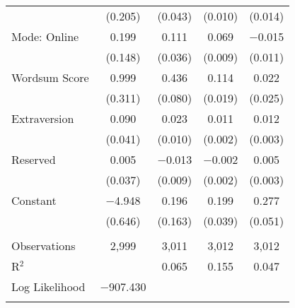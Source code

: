 \begin{table}[!htbp]
\begin{tabular}{@{\extracolsep{0pt}}lcccc}
  & (0.205) & (0.043) & (0.010) & (0.014) \\ 
  Mode: Online & 0.199 & 0.111 & 0.069 & $-$0.015 \\ 
  & (0.148) & (0.036) & (0.009) & (0.011) \\ 
  Wordsum Score & 0.999 & 0.436 & 0.114 & 0.022 \\ 
  & (0.311) & (0.080) & (0.019) & (0.025) \\ 
  Extraversion & 0.090 & 0.023 & 0.011 & 0.012 \\ 
  & (0.041) & (0.010) & (0.002) & (0.003) \\ 
  Reserved & 0.005 & $-$0.013 & $-$0.002 & 0.005 \\ 
  & (0.037) & (0.009) & (0.002) & (0.003) \\ 
  Constant & $-$4.948 & 0.196 & 0.199 & 0.277 \\ 
  & (0.646) & (0.163) & (0.039) & (0.051) \\ 
 \hline \\[-1.8ex] 
Observations & 2,999 & 3,011 & 3,012 & 3,012 \\ 
R$^{2}$ &  & 0.065 & 0.155 & 0.047 \\ 
Log Likelihood & $-$907.430 &  &  &  \\ 
\hline 
\hline \\[-1.8ex] 
\end{tabular} 
\end{table} 
